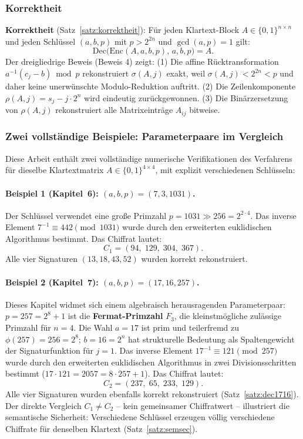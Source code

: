 ﻿\documentclass[a4paper,12pt]{scrreprt}
\theoremstyle{definition}
\begin{document}
\subsubsection{Korrektheit}

\textbf{Korrektheit} (Satz~\ref{satz:korrektheit}): Für jeden Klartext-Block $A \in \{0,1\}^{n\times n}$ und jeden Schlüssel $(a,b,p)$ mit $p > 2^{2n}$ und $\gcd(a,p)=1$ gilt:
\[
\mathrm{Dec}\bigl(\mathrm{Enc}(A,a,b,p),\,a,b,p\bigr) = A.
\]
Der dreigliedrige Beweis (Beweis 4) zeigt: (1) Die affine Rücktransformation $a^{-1}(c_j - b) \bmod p$ rekonstruiert $\sigma(A,j)$ exakt, weil $\sigma(A,j) < 2^{2n} < p$ und daher keine unerwünschte Modulo-Reduktion auftritt. (2) Die Zeilenkomponente $\rho(A,j) = s_j - j \cdot 2^n$ wird eindeutig zurückgewonnen. (3) Die Binärzersetzung von $\rho(A,j)$ rekonstruiert alle Matrixeinträge $A_{ij}$ bitweise.

\subsubsection{Zwei vollständige Beispiele: Parameterpaare im Vergleich}

Diese Arbeit enthält zwei vollständige numerische Verifikationen des Verfahrens für dieselbe Klartextmatrix $A \in \{0,1\}^{4\times4}$, mit explizit verschiedenen Schlüsseln:

\paragraph{Beispiel 1 (Kapitel~6): $(a, b, p) = (7, 3, 1031)$.}
Der Schlüssel verwendet eine große Primzahl $p = 1031 \gg 256 = 2^{2 \cdot 4}$. Das inverse Element $7^{-1} \equiv 442 \pmod{1031}$ wurde durch den erweiterten euklidischen Algorithmus bestimmt. Das Chiffrat lautet:
\[
C_1 = (94,\; 129,\; 304,\; 367).
\]
Alle vier Signaturen $(13, 18, 43, 52)$ wurden korrekt rekonstruiert.

\paragraph{Beispiel 2 (Kapitel~7): $(a, b, p) = (17, 16, 257)$.}
Dieses Kapitel widmet sich einem algebraisch herausragenden Parameterpaar: $p = 257 = 2^8 + 1$ ist die \textbf{Fermat-Primzahl} $F_3$, die kleinstmögliche zulässige Primzahl für $n=4$. Die Wahl $a = 17$ ist prim und teilerfremd zu $\phi(257) = 256 = 2^8$; $b = 16 = 2^n$ hat strukturelle Bedeutung als Spaltengewicht der Signaturfunktion für $j=1$. Das inverse Element $17^{-1} \equiv 121 \pmod{257}$ wurde durch den erweiterten euklidischen Algorithmus in zwei Divisionsschritten bestimmt ($17 \cdot 121 = 2057 = 8 \cdot 257 + 1$). Das Chiffrat lautet:
\[
C_2 = (237,\; 65,\; 233,\; 129).
\]
Alle vier Signaturen wurden ebenfalls korrekt rekonstruiert (Satz~\ref{satz:dec1716}). Der direkte Vergleich $C_1 \neq C_2$ -- kein gemeinsamer Chiffratwert -- illustriert die semantische Sicherheit: Verschiedene Schlüssel erzeugen völlig verschiedene Chiffrate für denselben Klartext (Satz~\ref{satz:semsec}).
\end{document}
